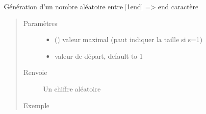 \documentclass[letterpaper,10pt,french]{sphinxmanual}
\begin{document}
\begin{fulllineitems}
\label{\detokenize{modules/tools:toolbox.tools.aleatoire}}
Génération d’un nombre aléatoire entre {[}1\sphinxhyphen{}end{]} =\textgreater{} end caractère
\begin{quote}\begin{description}
\item[{Paramètres}] \leavevmode\begin{itemize}
\item {} 
 () \textendash{} valeur maximal (paut indiquer la taille si s=1)

\item {} 
 \textendash{} valeur de départ, default to 1

\end{itemize}

\item[{Renvoie}] \leavevmode
Un chiffre aléatoire

\item[{Exemple}] \leavevmode
\begin{sphinxVerbatim}[commandchars=\\\{\}]
 
 
\end{sphinxVerbatim}

\end{description}\end{quote}

\end{fulllineitems}

\end{document}
